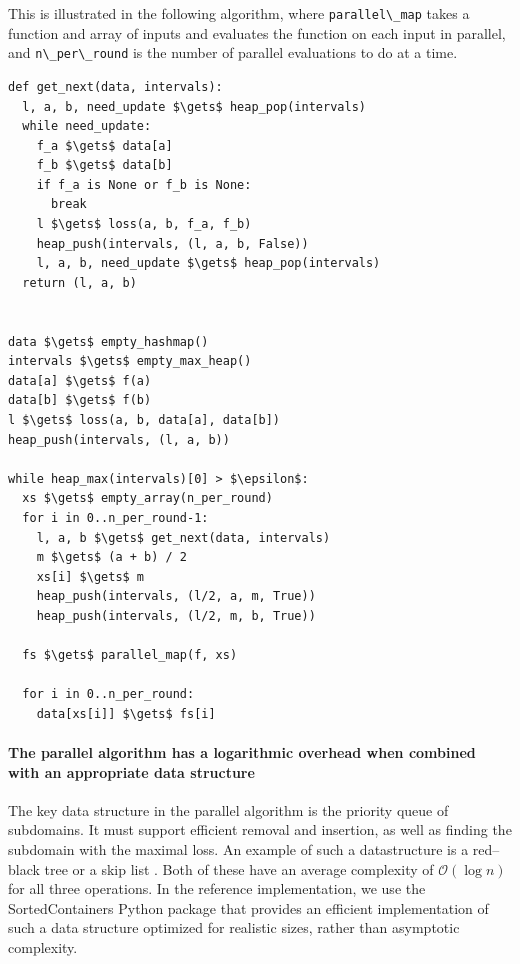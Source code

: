 This is illustrated in the following algorithm, where \passthrough{\lstinline!parallel\_map!} takes a function and array of inputs and evaluates the function on each input in parallel, and \passthrough{\lstinline!n\_per\_round!} is the number of parallel evaluations to do at a time.

\begin{lstlisting}
def get_next(data, intervals):
  l, a, b, need_update $\gets$ heap_pop(intervals)
  while need_update:
    f_a $\gets$ data[a]
    f_b $\gets$ data[b]
    if f_a is None or f_b is None:
      break
    l $\gets$ loss(a, b, f_a, f_b)
    heap_push(intervals, (l, a, b, False))
    l, a, b, need_update $\gets$ heap_pop(intervals)
  return (l, a, b)


data $\gets$ empty_hashmap()
intervals $\gets$ empty_max_heap()
data[a] $\gets$ f(a)
data[b] $\gets$ f(b)
l $\gets$ loss(a, b, data[a], data[b])
heap_push(intervals, (l, a, b))

while heap_max(intervals)[0] > $\epsilon$:
  xs $\gets$ empty_array(n_per_round)
  for i in 0..n_per_round-1:
    l, a, b $\gets$ get_next(data, intervals)
    m $\gets$ (a + b) / 2
    xs[i] $\gets$ m
    heap_push(intervals, (l/2, a, m, True))
    heap_push(intervals, (l/2, m, b, True))

  fs $\gets$ parallel_map(f, xs)

  for i in 0..n_per_round:
    data[xs[i]] $\gets$ fs[i]
\end{lstlisting}

\hypertarget{the-parallel-algorithm-has-a-logarithmic-overhead-when-combined-with-an-appropriate-data-structure}{%
\paragraph{The parallel algorithm has a logarithmic overhead when combined with an appropriate data structure}\label{the-parallel-algorithm-has-a-logarithmic-overhead-when-combined-with-an-appropriate-data-structure}}

The key data structure in the parallel algorithm is the priority queue of subdomains.
It must support efficient removal and insertion, as well as finding the subdomain with the maximal loss.
An example of such a datastructure is a red--black tree or a skip list .
Both of these have an average complexity of $\mathcal{O}(\log{n})$ for all three operations.
In the reference implementation, we use the SortedContainers Python package that provides an efficient implementation of such a data structure optimized for realistic sizes, rather than asymptotic complexity.

